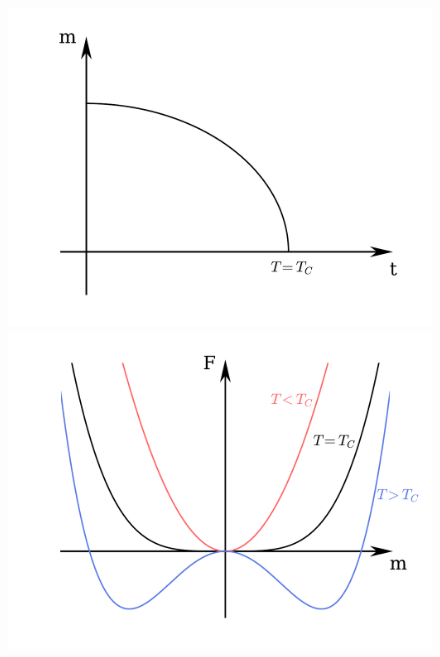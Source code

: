 \documentclass[10pt]{report}
\numberwithin{equation}{chapter}
\begin{document}
\begin{figure}[t]
  \begin{minipage}[c][6.00cm]{.5\textwidth}
    \vspace*{\fill}
    \centering
    \includegraphics[width=0.916\linewidth]{../img/ferromag_M_T.pdf}
    \captionsetup{width=.95\linewidth}
  \end{minipage}%
  \begin{minipage}[c][6.00cm]{.5\textwidth}
    \vspace*{\fill}
    \centering
    \includegraphics[width=0.95\linewidth]{../img/ferromag_landau.pdf}
    \captionsetup{width=.95\linewidth}
  \end{minipage}
  \label{fig:2:tests}
\end{figure}
\end{document}
